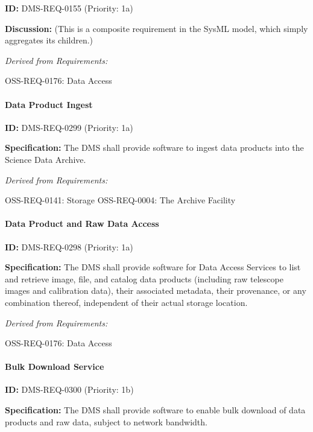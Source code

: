 \documentclass[SE,toc,lsstdraft]{lsstdoc}
\begin{document}
\label{DMS-REQ-0155}
\textbf{ID:} DMS-REQ-0155 (Priority: 1a)

\textbf{Discussion:}
(This is a composite requirement in the SysML model, which simply aggregates its children.)

\emph{Derived from Requirements:}

OSS-REQ-0176:
Data Access \newline

\paragraph{Data Product Ingest}\hfill  %

\label{DMS-REQ-0299}
\textbf{ID:} DMS-REQ-0299 (Priority: 1a)

\textbf{Specification:} The DMS shall provide software to ingest data products into the Science Data Archive.

\emph{Derived from Requirements:}

OSS-REQ-0141:
Storage \newline
OSS-REQ-0004:
The Archive Facility \newline

\paragraph{Data Product and Raw Data Access}\hfill  %

\label{DMS-REQ-0298}
\textbf{ID:} DMS-REQ-0298 (Priority: 1a)

\textbf{Specification:} The DMS shall provide software for Data Access Services to list and retrieve image, file, and catalog data products (including raw telescope images and calibration data), their associated metadata, their provenance, or any combination thereof, independent of their actual storage location.

\emph{Derived from Requirements:}

OSS-REQ-0176:
Data Access \newline

\paragraph{Bulk Download Service}\hfill  %

\label{DMS-REQ-0300}
\textbf{ID:} DMS-REQ-0300 (Priority: 1b)

\textbf{Specification:} The DMS shall provide software to enable bulk download of data products and raw data, subject to network bandwidth.
\end{document}
